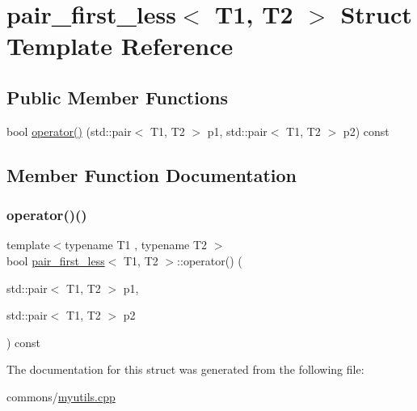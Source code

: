 \hypertarget{structpair__first__less}{}\section{pair\+\_\+first\+\_\+less$<$ T1, T2 $>$ Struct Template Reference}
\label{structpair__first__less}
\subsection*{Public Member Functions}
\begin{DoxyCompactItemize}
\item 
bool \mbox{\hyperlink{structpair__first__less_afb3b6b750c8b4148623201551b86fdbd}{operator()}} (std\+::pair$<$ T1, T2 $>$ p1, std\+::pair$<$ T1, T2 $>$ p2) const
\end{DoxyCompactItemize}


\subsection{Member Function Documentation}
\mbox{\label{structpair__first__less_afb3b6b750c8b4148623201551b86fdbd}} 
\subsubsection{\texorpdfstring{operator()()}{operator()()}}
{\footnotesize\ttfamily template$<$typename T1 , typename T2 $>$ \\
bool \mbox{\hyperlink{structpair__first__less}{pair\+\_\+first\+\_\+less}}$<$ T1, T2 $>$\+::operator() (\begin{DoxyParamCaption}\item[{std\+::pair$<$ T1, T2 $>$}]{p1,  }\item[{std\+::pair$<$ T1, T2 $>$}]{p2 }\end{DoxyParamCaption}) const\hspace{0.3cm}{\ttfamily [inline]}}



The documentation for this struct was generated from the following file\+:\begin{DoxyCompactItemize}
\item 
commons/\mbox{\hyperlink{myutils_8cpp}{myutils.\+cpp}}\end{DoxyCompactItemize}
